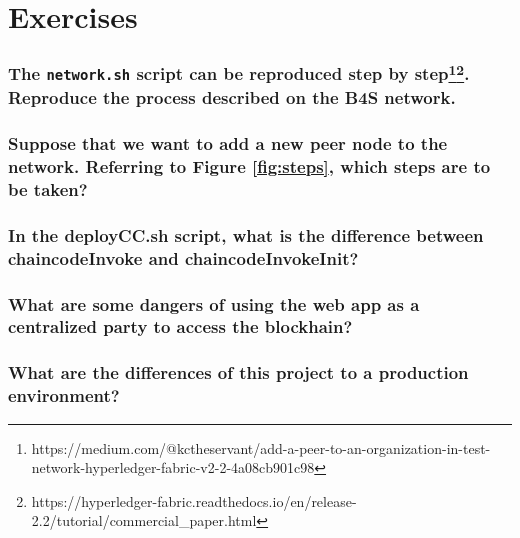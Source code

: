 \documentclass[12pt,a4paper]{article}
\theoremstyle{definition}
\begin{document}






%





\section{Exercises}



\subsubsection*{The \texttt{network.sh} script can be reproduced step by step\footnote{https://medium.com/@kctheservant/add-a-peer-to-an-organization-in-test-network-hyperledger-fabric-v2-2-4a08cb901c98}\footnote{https://hyperledger-fabric.readthedocs.io/en/release-2.2/tutorial/commercial\_paper.html}. Reproduce the process described on the B4S network.}

\subsubsection*{Suppose that we want to add a new peer node to the network. Referring to Figure \ref{fig:steps}, which steps are to be taken?}

\subsubsection*{In the deployCC.sh script, what is the difference between chaincodeInvoke and chaincodeInvokeInit?}

\subsubsection*{What are some dangers of using the web app as a centralized party to access the blockhain?}


\subsubsection*{What are the differences of this project to a production environment?}





\end{document}
